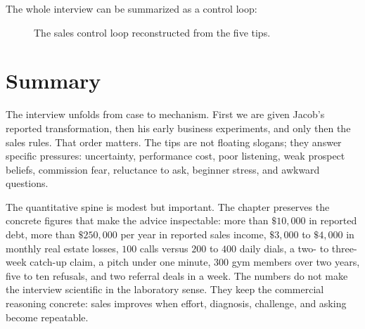 The whole interview can be summarized as a control loop:

\begin{figure}
\centering
{}
\caption{The sales control loop reconstructed from the five tips.}
\end{figure}

\section{Summary}

The interview unfolds from case to mechanism. First we are given Jacob's reported transformation, then his early business experiments, and only then the sales rules. That order matters. The tips are not floating slogans; they answer specific pressures: uncertainty, performance cost, poor listening, weak prospect beliefs, commission fear, reluctance to ask, beginner stress, and awkward questions.

The quantitative spine is modest but important. The chapter preserves the concrete figures that make the advice inspectable: more than \(\$10{,}000\) in reported debt, more than \(\$250{,}000\) per year in reported sales income, \(\$3{,}000\) to \(\$4{,}000\) in monthly real estate losses, \(100\) calls versus \(200\) to \(400\) daily dials, a two- to three-week catch-up claim, a pitch under one minute, \(300\) gym members over two years, five to ten refusals, and two referral deals in a week. The numbers do not make the interview scientific in the laboratory sense. They keep the commercial reasoning concrete: sales improves when effort, diagnosis, challenge, and asking become repeatable.
